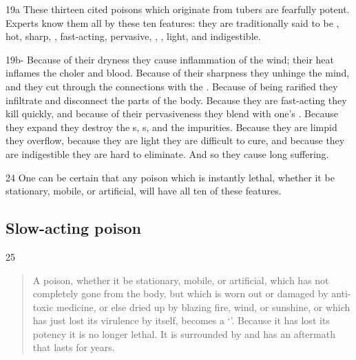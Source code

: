\begin{translation}
    \item[ 19a]
    These thirteen cited poisons which originate from tubers are fearfully
    potent. Experts know them all by these ten features: they are traditionally
    said to be , hot, sharp, ,
    fast-acting, pervasive, , ,
    light, and indigestible.
    
    \item[ 19b-]
    Because of their dryness they cause inflammation of the wind; their heat
    inflames the choler and blood. Because of their sharpness they unhinge the
    mind, and they cut through the connections with the .  Because of being rarified they infiltrate and disconnect
    the parts of the body. Because they are fast-acting they kill quickly, and
    because of their pervasiveness they blend with one's .  Because they expand they destroy the
    s, s, and the
    impurities.  Because they are limpid they overflow,
    because they are light they are difficult to cure, and because they are
    indigestible they are hard to eliminate.  And so they cause long suffering.
    
    \item[ 24]
    One can be certain that any poison which is instantly lethal, whether it be
    stationary, mobile, or artificial, will have all ten of these features.
    
    \subsection{Slow-acting poison}
    \item[25]  
    \begin{verse}
        A poison, whether it be stationary, mobile, or artificial, which has not
        completely gone from the body, but which is worn out or damaged by
        anti-toxic medicine, or else dried up by blazing fire, wind, or sunshine, or
        which has just lost its virulence by itself, becomes a `'\label{dusivisa}.  Because it has lost its potency it is
        no longer lethal.  It is surrounded by  and has an
        aftermath that lasts for years.
        

\end{verse}
\end{translation}
